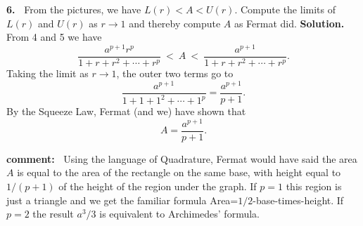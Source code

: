 \documentclass[12pt]{article}
\theoremstyle{definition}
\theoremstyle{remark}
\theoremstyle{definition}
\newenvironment{Solution}{\noindent\textbf{Solution.}}{}
\begin{document}
{\bf 6.\ } From the pictures, we have $L(r)<A<U(r)$.  Compute the limits of $L(r)$ and $U(r)$ as $r\to 1$ and 
thereby compute $A$ as Fermat did. 
\vskip5pt
\begin{Solution} From 4 and 5 we have 
\[\frac{a^{p+1}r^p}{1+r+r^2+\cdots +r^p}\ < \ A\ <\ 
\frac{a^{p+1}}{1+r+r^2+\cdots +r^p}.
\]
Taking the limit as $r\to1$, the outer two terms go to
\[\frac{a^{p+1}}{1+1+1^2+\cdots +1^p}=\frac{a^{p+1}}{p+1}.\]
By the Squeeze Law, Fermat (and we) have shown that 
\[A=\frac{a^{p+1}}{p+1}.\]

\end{Solution}

{\bf comment:\ } Using the language of Quadrature, Fermat would have said the area $A$ is equal to the area of the rectangle on the same base, with height equal to $1/(p+1)$ of the height of the region under the graph. 
If $p=1$ this region is just a triangle and we get the familiar formula Area=$1/2$-base-times-height. If $p=2$ the result $a^3/3$ is equivalent to Archimedes' formula. 

\end{document}
